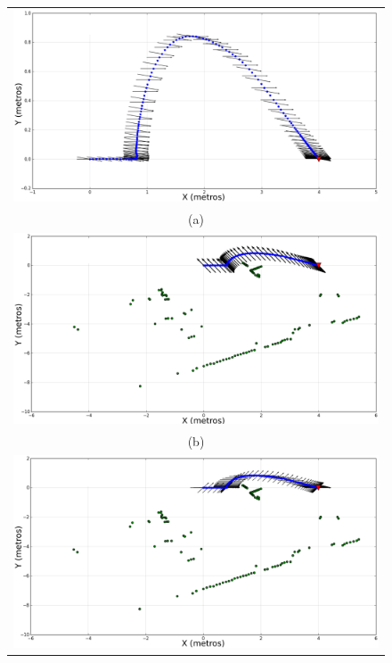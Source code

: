 \begin{figure}
  \centering
    \begin{tabular}{c}
      \multicolumn{1}{c}{\includegraphics[width=.75\textwidth]{images/fattr_lidar_s.eps}}\\
      \multicolumn{1}{c}{(a)}\\
      \multicolumn{1}{c}{\includegraphics[width=.75\textwidth]{images/frep_lidar_s.eps}}\\
      \multicolumn{1}{c}{(b)}\\
      \multicolumn{1}{c}{\includegraphics[width=.75\textwidth]{images/fnav_lidar_s.eps}}\\

\end{tabular}
\end{figure}
